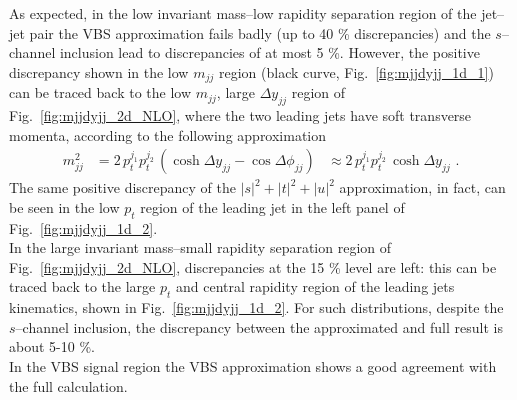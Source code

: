 As expected, in the low invariant mass--low rapidity separation region of the jet--jet pair the VBS approximation fails badly (up to 40 \% discrepancies) and the $s$--channel inclusion lead to discrepancies of at most 5 \%. However, the positive discrepancy shown in the low $m_{jj}$ region (black curve, Fig.~\ref{fig:mjjdyjj_1d_1}) can be traced back to the low $m_{jj}$, large $\Delta y_{jj}$ region of Fig.~\ref{fig:mjjdyjj_2d_NLO}, where the two leading jets have soft transverse momenta, according to the following approximation
\begin{equation}
\begin{split}
m_{jj}^2 &= 2\,p_t^{j_1}p_t^{j_2}\,(\cosh \Delta y_{jj} - \cos \Delta\phi_{jj})
&\approx 2\,p_t^{j_1}p_t^{j_2}\,\cosh \Delta y_{jj} \,\,.
\end{split}
\end{equation}
The same positive discrepancy of the $|s|^2 + |t|^2 + |u|^2$ approximation, in fact, can be seen in the low $p_t$ region of the leading jet in the left panel of Fig.~\ref{fig:mjjdyjj_1d_2}.\\
In the large invariant mass--small rapidity separation region of Fig.~\ref{fig:mjjdyjj_2d_NLO}, discrepancies at the 15 \% level are left: this can be traced back to the large $p_t$ and central rapidity region of the leading jets kinematics, shown in Fig.~\ref{fig:mjjdyjj_1d_2}. For such distributions, despite the $s$--channel inclusion, the discrepancy between the approximated and full result is about 5-10 \%.\\
In the VBS signal region the VBS approximation shows a good agreement with the full calculation.
